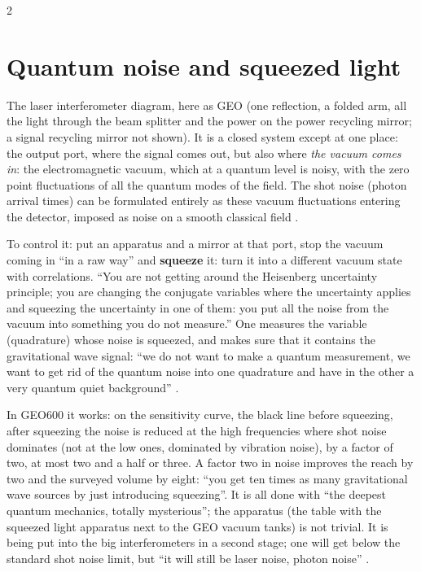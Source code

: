 \begin{paracol}{2}
\section{Quantum noise and squeezed light}\label{sec:c28-squeezing}

The laser interferometer diagram, here as GEO (one reflection, a folded arm, all the light through the beam splitter and the power on the power recycling mirror; a signal recycling mirror not shown). It is a closed system except at one place: the output port, where the signal comes out, but also where \emph{the vacuum comes in}: the electromagnetic vacuum, which at a quantum level is noisy, with the zero point fluctuations of all the quantum modes of the field. The shot noise (photon arrival times) can be formulated entirely as these vacuum fluctuations entering the detector, imposed as noise on a smooth classical field .

To control it: put an apparatus and a mirror at that port, stop the vacuum coming in ``in a raw way'' and \textbf{squeeze} it: turn it into a different vacuum state with correlations. ``You are not getting around the Heisenberg uncertainty principle; you are changing the conjugate variables where the uncertainty applies and squeezing the uncertainty in one of them: you put all the noise from the vacuum into something you do not measure.'' One measures the variable (quadrature) whose noise is squeezed, and makes sure that it contains the gravitational wave signal: ``we do not want to make a quantum measurement, we want to get rid of the quantum noise into one quadrature and have in the other a very quantum quiet background'' .

In GEO600 it works: on the sensitivity curve, the black line before squeezing, after squeezing the noise is reduced at the high frequencies where shot noise dominates (not at the low ones, dominated by vibration noise), by a factor of two, at most two and a half or three. A factor two in noise improves the reach by two and the surveyed volume by eight: ``you get ten times as many gravitational wave sources by just introducing squeezing''. It is all done with ``the deepest quantum mechanics, totally mysterious''; the apparatus (the table with the squeezed light apparatus next to the GEO vacuum tanks) is not trivial. It is being put into the big interferometers in a second stage; one will get below the standard shot noise limit, but ``it will still be laser noise, photon noise'' .


\end{paracol}
